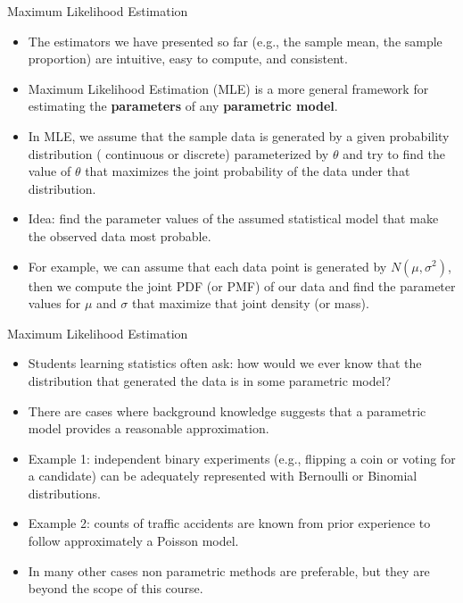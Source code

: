 \documentclass[handout]{beamer}
\begin{document}
\begin{frame}{Maximum Likelihood Estimation}
\scriptsize{
\begin{itemize}
 \item The estimators we have presented so far (e.g., the sample mean, the sample proportion) are intuitive, easy to compute, and consistent.
 \item Maximum Likelihood Estimation (MLE) is a more general framework  for estimating the \textbf{parameters} of any \textbf{parametric model}.
 \item In MLE, we assume that the sample data is generated by a given probability distribution ( continuous or discrete) parameterized by $\theta$ and try to find the value of $\theta$ that maximizes the joint probability of the data under that distribution. 
 \item Idea: find the parameter values of the assumed statistical model that make the observed data most probable.
 \item For example, we can assume that each data point is generated by $N(\mu,\sigma^2)$, then we compute the joint PDF (or PMF) of our data and find the parameter values for $\mu$ and $\sigma$ that maximize that joint density (or mass).
 
\end{itemize}


} 
 
\end{frame}

\begin{frame}{Maximum Likelihood Estimation}
\scriptsize{
\begin{itemize}
 \item Students learning statistics often ask: how would we ever know that the distribution that generated the data is in some parametric model? \cite{wasserman2013all}
 \item There are  cases where background knowledge suggests that a parametric model provides a reasonable approximation. 
 \item Example 1: independent binary experiments (e.g., flipping a coin or voting for a candidate) can be adequately represented with Bernoulli or Binomial distributions.
 \item Example 2: counts of traffic accidents are known from prior experience to follow approximately a Poisson model.  
 
 \item  In many other cases non parametric methods are preferable, but they are beyond the scope of this course.
 
\end{itemize}


} 
 
\end{frame}
\end{document}
